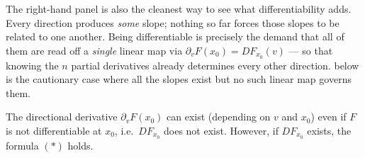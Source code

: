 The right-hand panel is also the cleanest way to see what differentiability adds. Every direction
produces \emph{some} slope; nothing so far forces those slopes to be related to one another. Being
differentiable is precisely the demand that all of them are read off a \emph{single} linear map
via $\partial_vF(x_0) = DF_{x_0}(v)$ --- so that knowing the $n$ partial derivatives already
determines every other direction.  below is the
cautionary case where all the slopes exist but no such linear map governs them.

\begin{importantremark}
\label{rem:directional_derivative_caveat}
The directional derivative $\partial_v F(x_0)$ can exist (depending on $v$ and $x_0$) even if $F$
is not differentiable at $x_0$, i.e.\ $DF_{x_0}$ does not exist. However, if $DF_{x_0}$ exists,
the formula $(*)$ holds.
\end{importantremark}

